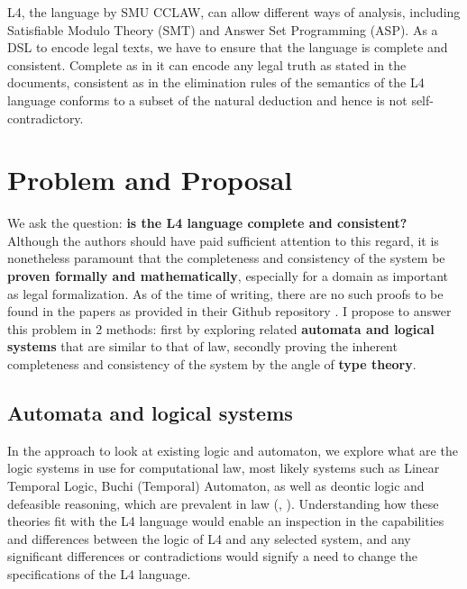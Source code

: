 \documentclass[11pt, sigconf]{acmart}
\begin{document}
L4, the language by SMU CCLAW, can allow different ways of analysis, including
Satisfiable Modulo Theory (SMT) and Answer Set Programming (ASP). As a DSL to
encode legal texts, we have to ensure that the language is complete and
consistent. Complete as in it can encode any legal truth as stated in the
documents, consistent as in the elimination rules of the semantics of the L4
language conforms to a subset of the natural deduction and hence is not
self-contradictory.

\section{Problem and Proposal}
\label{sec:problem}
We ask the question: \textbf{is the L4 language complete and consistent?}
Although the authors should have paid sufficient attention to this regard, it is
nonetheless paramount that the completeness and consistency of the system be
\textbf{proven formally and mathematically}, especially for a domain as
important as legal formalization. As of the time of writing, there are no such
proofs to be found in the papers as provided in their Github repository
\cite{smucclaw}. I propose to answer this problem in 2 methods: first by
exploring related \textbf{automata and logical systems }that are similar to that
of law, secondly proving the inherent completeness and consistency of the system
by the angle of \textbf{type theory}.

\subsection{Automata and logical systems}
\label{subsec:automata}

In the approach to look at existing logic and automaton, we explore what are the
logic systems in use for computational law, most likely systems such as Linear
Temporal Logic, Buchi (Temporal) Automaton, as well as deontic logic and
defeasible reasoning, which are prevalent in law (\cite{sep-logic-deontic},
\cite{sep-reasoning-defeasible}). Understanding how these theories fit with the
L4 language would enable an inspection in the capabilities and differences
between the logic of L4 and any selected system, and any significant differences
or contradictions would signify a need to change the specifications of the L4
language.
\end{document}
